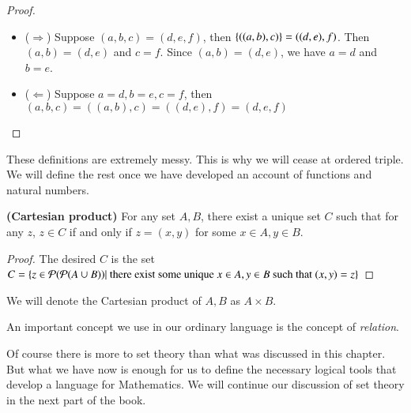 \begin{proof}
    ~
    \begin{itemize}
        \item ($\Rightarrow$) Suppose $(a,b,c) = (d,e,f)$, then $\{((a,b),c)\} = ((d,e),f)$. Then $(a,b) = (d,e)$ and $c=f$. Since $(a,b) = (d,e)$, we have $a = d$ and $b=e$.
        \item ($\Leftarrow$) Suppose $a = d, b = e, c = f$, then $(a,b,c) = ((a,b) ,c) = ((d,e),f) = (d,e,f)$
    \end{itemize}
\end{proof}
These definitions are extremely messy. This is why we will cease at ordered triple. We will define the rest once we have developed an account of functions and natural numbers.
\begin{prop}
    {\textbf{(Cartesian product)} For any set $A,B$, there exist a unique set $C$ such that for any $z$, $z\in C$ if and only if $z= (x,y)$ for some $x\in A, y\in B$}.
\end{prop}
\begin{proof}
        The desired $C$ is the set $C =  \{z\in\mathcal P (\mathcal P(A\cup B))|\text{ there exist some unique }x\in A,y\in B\text{ such that }(x,y) = z\}$
\end{proof}
\begin{rem}
    We will denote the Cartesian product of $A,B$ as $A\times B$.
\end{rem}
An important concept we use in our ordinary language is the concept of \textit{relation}. 

Of course there is more to set theory than what was discussed in this chapter. But what we have now is enough for us to define the necessary logical tools that develop a language for Mathematics. We will continue our discussion of set theory in the next part of the book.